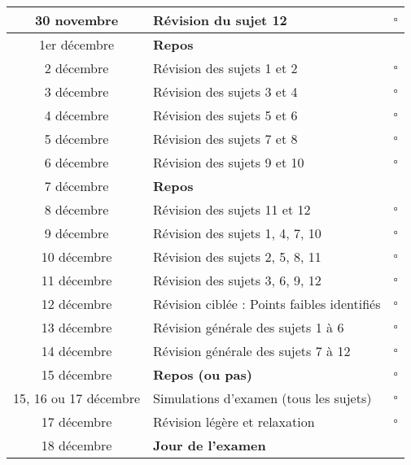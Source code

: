 \documentclass[a4paper,12pt]{report}
\begin{document}
\begin{longtable}{|c|p{8cm}|c|}
\hline
30 novembre & Révision du sujet 12 & $\square$\\

\hline
1er décembre & \textbf{Repos} \\
\hline
2 décembre & Révision des sujets 1 et 2 & $\square$\\

\hline
3 décembre & Révision des sujets 3 et 4 & $\square$\\

\hline
4 décembre & Révision des sujets 5 et 6 & $\square$\\

\hline
5 décembre & Révision des sujets 7 et 8 & $\square$\\

\hline
6 décembre & Révision des sujets 9 et 10 & $\square$\\

\hline
7 décembre & \textbf{Repos} \\
\hline
8 décembre & Révision des sujets 11 et 12 & $\square$\\

\hline
9 décembre & Révision des sujets 1, 4, 7, 10 & $\square$\\

\hline
10 décembre & Révision des sujets 2, 5, 8, 11 & $\square$\\

\hline
11 décembre & Révision des sujets 3, 6, 9, 12 & $\square$\\

\hline
12 décembre & Révision ciblée : Points faibles identifiés & $\square$\\

\hline
13 décembre & Révision générale des sujets 1 à 6 & $\square$\\

\hline
14 décembre & Révision générale des sujets 7 à 12 & $\square$\\

\hline
15 décembre & \textbf{Repos (ou pas)} & $\square$\\

\hline
15, 16 ou 17 décembre & Simulations d'examen (tous les sujets) & $\square$\\

\hline
17 décembre & Révision légère et relaxation & $\square$\\

\hline
18 décembre & \textbf{Jour de l'examen} \\
\hline
\end{longtable}
\end{document}
